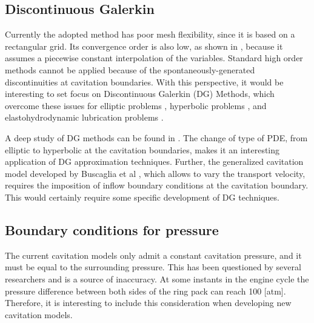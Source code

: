 \subsection*{Discontinuous Galerkin}

Currently the adopted method has poor mesh flexibility, since it is based on a rectangular grid. Its convergence order is also low, as shown in  , because it assumes a piecewise constant interpolation of the variables. Standard high order methods cannot be applied because of the spontaneously-generated discontinuities at cavitation boundaries. With this perspective, it would be interesting to set focus on Discontinuous Galerkin (DG) Methods, which overcome these issues for elliptic problems \cite{cb2013}, hyperbolic problems \cite{cockburn2001,cockburn2003},  and elastohydrodynamic lubrication problems \cite{lbgj2012}.

A deep study of DG methods can be found in \cite{abcm2002}. The change of type of PDE, from elliptic to hyperbolic at the cavitation boundaries, makes it an interesting application of DG approximation techniques. Further, the generalized cavitation model developed by Buscaglia et al \cite{buscaglia13,ausas2013}, which allows to vary the transport velocity, requires the imposition of inflow boundary conditions at the cavitation boundary. This would certainly require some specific development of DG techniques.

\subsection*{Boundary conditions for pressure}
The current cavitation models only admit a constant cavitation pressure, and it must be equal to the surrounding pressure. This has been questioned by several researchers \cite{shen2013} and is a source of inaccuracy. At some instants in the engine cycle the pressure difference between both sides of the ring pack can reach 100 [atm]. Therefore, it is interesting to include this consideration when developing new cavitation models.